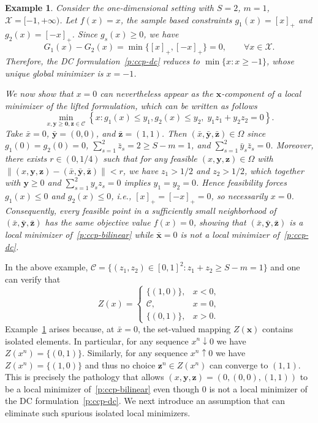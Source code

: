 \documentclass[11pt]{article}
\newtheorem{example}[theorem]{Example}
\def\bs{\boldsymbol}
\def\C{\mathcal{C}}
\def\X{\mathcal{X}}
\begin{document}
\begin{example}\label{exa:failure-Q2P}
Consider the one-dimensional setting with $S=2$, $m=1$, $\X=[-1,+\infty)$. Let $f(x)=x$, the sample based constraints $g_1(x)=[x]_+$ and $g_2(x)=[-x]_+$. Since $g_s(x)\ge 0$, we have
\[
G_1(x)- G_2(x) = \min\{[x]_+,[-x]_+\}=0,\qquad \forall x\in\X.
\]
Therefore, the DC formulation~\eqref{p:ccp-dc} reduces to $\min\{x:x\ge -1\}$, whose unique global minimizer is $x=-1$.

We now show that $x=0$ can nevertheless appear as the $\bs{x}$-component of a local minimizer of the lifted formulation, which can be written as follows
\[
\min_{x, \bs{y}\geq \bs{0}, \bs{z}\in\C} \left \{x: g_1(x) \leq y_1, g_2(x) \leq y_2, \; y_1z_1 + y_2 z_2 = 0 \right\}.
\]
Take $\bar{x}=0$, $\bar{\bs{y}}=(0,0)$, and $\bar{\bs{z}}=(1,1)$. Then $(\bar{x},\bar{\bs{y}},\bar{\bs{z}})\in\Omega$ since $g_1(0)=g_2(0)=0$, $\sum_{s=1}^2\bar z_s=2\ge S-m=1$, and $\sum_{s=1}^2 \bar y_s\bar z_s=0$. Moreover, there exists $r\in(0,1/4)$ such that for any feasible $(x,\bs{y},\bs{z})\in\Omega$ with $\|(x,\bs{y},\bs{z})-(\bar{x},\bar{\bs{y}},\bar{\bs{z}})\|<r$, we have $z_1>1/2$ and $z_2>1/2$, which together with $\bs{y}\ge 0$ and $\sum_{s=1}^2 y_s z_s=0$ implies $y_1=y_2=0$. Hence feasibility forces $g_1(x)\le 0$ and $g_2(x)\le 0$, i.e., $[x]_+=[-x]_+=0$, so necessarily $x=0$. Consequently, every feasible point in a sufficiently small neighborhood of $(\bar{x},\bar{\bs{y}},\bar{\bs{z}})$ has the same objective value $f(x)=0$, showing that $(\bar{x},\bar{\bs{y}},\bar{\bs{z}})$ is a local minimizer of~\eqref{p:ccp-bilinear} while $\bar{\bs{x}}=0$ is not a
local minimizer of~\eqref{p:ccp-dc}. 
\end{example}

In the above example, $\C=\{(z_1,z_2)\in[0,1]^2:z_1+z_2\ge S-m=1\}$ and one can verify that
\[
Z(x)=
\begin{cases}
\{(1,0)\}, & x<0,\\
\C, & x=0,\\
\{(0,1)\}, & x>0.
\end{cases}
\]
Example~\ref{exa:failure-Q2P} arises because, at $\bar{x}=0$, the set-valued mapping $Z(\bs{x})$ contains isolated elements. In particular, for any
sequence $x^n\downarrow 0$ we have $Z(x^n)=\{(0,1)\}$. Similarly, for any sequence $x^n\uparrow 0$ we have $Z(x^n)=\{(1,0)\}$ and thus no choice $\bs{z}^n\in Z(x^n)$ can converge to $(1,1)$. This is precisely the pathology that allows $(x,\bs{y},\bs{z}) =(0,(0,0),(1,1))$ to be a local minimizer of~\eqref{p:ccp-bilinear} even though $0$ is not a local minimizer of the DC formulation~\eqref{p:ccp-dc}. We next introduce an assumption that can eliminate such spurious isolated local minimizers.
\end{document}
